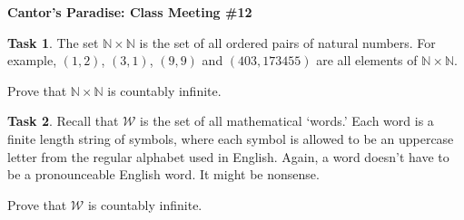 \documentclass[12pt]{amsart}
\theoremstyle{definition}
\newtheorem{task}{Task}
\begin{document}
\begin{center}
\textbf{\Huge
Cantor's Paradise: Class Meeting \#12
}
\end{center}

\vspace{.5in}

\begin{task}
The set $\mathbb{N}\times\mathbb{N}$ is the set of all ordered pairs of natural numbers. For example, $(1,2)$, $(3,1)$, $(9,9)$ and $(403, 173455)$ are all elements of $\mathbb{N}\times\mathbb{N}$.

Prove that $\mathbb{N}\times\mathbb{N}$ is countably infinite.
\end{task}

\begin{task} Recall that $\mathcal{W}$ is the set of all mathematical `words.'
Each word is a finite length string of symbols, where each symbol is allowed to be an uppercase letter from the regular alphabet used in English.
Again, a word doesn't have to be a pronounceable English word.
It might be nonsense.

Prove that $\mathcal{W}$ is countably infinite.
\end{task}
\end{document}
